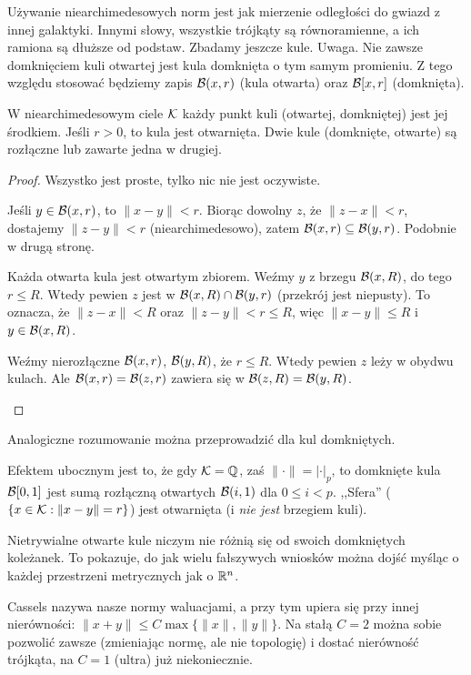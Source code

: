 Używanie niearchimedesowych norm jest jak mierzenie odległości do gwiazd z innej galaktyki.
Innymi słowy, wszystkie trójkąty są równoramienne, a ich ramiona są dłuższe od podstaw.
Zbadamy jeszcze kule.
Uwaga. 
Nie zawsze domknięciem kuli otwartej jest kula domknięta o tym samym promieniu.
Z tego względu stosować będziemy zapis $\mathcal B(x, r)$ (kula otwarta) oraz $\mathcal B[x, r]$ (domknięta).

\begin{fakt}
	W niearchimedesowym ciele $\mathcal K$ każdy punkt kuli (otwartej, domkniętej) jest jej środkiem.
	Jeśli $r > 0$, to kula jest otwarnięta.
	Dwie kule (domknięte, otwarte) są rozłączne lub zawarte jedna w drugiej.
\end{fakt}

\begin{proof}
	Wszystko jest proste, tylko nic nie jest oczywiste.
	\begin{enumx}
		\item Jeśli $y \in \mathcal B(x, r)$, to $\|x-y\| < r$.
		Biorąc dowolny $z$, że $\|z-x\| < r$, dostajemy $\|z-y\| < r$ (niearchimedesowo), zatem $\mathcal B(x,r) \subseteq \mathcal B(y,r)$.
		Podobnie w drugą stronę.
		\item Każda otwarta kula jest otwartym zbiorem.
		Weźmy $y$ z brzegu $\mathcal B(x,R)$, do tego $r \le R$.
		Wtedy pewien $z$ jest w $\mathcal B(x,R) \cap \mathcal B(y,r)$ (przekrój jest niepusty).
		To oznacza, że $\|z-x\| < R$ oraz $\|z - y\| < r \le R$, więc $\|x-y\| \le R$ i $y \in \mathcal B(x,R)$.
		\item Weźmy nierozłączne $\mathcal B(x,r)$, $\mathcal B(y,R)$, że $r \le R$.
		Wtedy pewien $z$ leży w obydwu kulach.
		Ale $\mathcal B(x,r) = \mathcal B(z,r)$ zawiera się w $\mathcal B(z,R) = \mathcal B(y,R)$. \qedhere
	\end{enumx}
\end{proof}

Analogiczne rozumowanie można przeprowadzić dla kul domkniętych.

Efektem ubocznym jest to, że gdy $\mathcal K = \mathbb Q$, zaś $\|\cdot\| = |\cdot|_p$, to domknięte kula $\mathcal B [0,1]$ jest sumą rozłączną otwartych $\mathcal B (i, 1)$ dla $0 \le i < p$.
,,Sfera'' ($\{x \in \mathcal K : \|x-y\| = r\}$) jest otwarnięta (i \emph{nie jest} brzegiem kuli).

Nietrywialne otwarte kule niczym nie różnią się od swoich domkniętych koleżanek.
To pokazuje, do jak wielu fałszywych wniosków można dojść myśląc o każdej przestrzeni metrycznych jak o $\mathbb R^n$.

Cassels nazywa nasze normy waluacjami, a przy tym upiera się przy innej nierówności:
$\|x+y\| \le C \max \{\|x\|, \|y\|\}$.
Na stałą $C = 2$ można sobie pozwolić zawsze (zmieniając normę, ale nie topologię) i dostać nierówność trójkąta, na $C= 1$ (ultra) już niekoniecznie.

